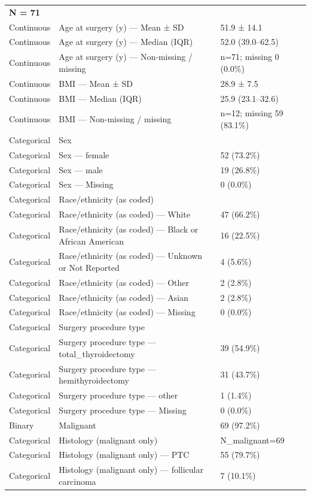\begin{table}[htbp]
\begin{tabular}{lll}
\multicolumn{3}{l}{\textbf{N = 71}} \\
Continuous & Age at surgery (y) — Mean ± SD & 51.9 ± 14.1 \\
Continuous & Age at surgery (y) — Median (IQR) & 52.0 (39.0–62.5) \\
Continuous & Age at surgery (y) — Non-missing / missing & n=71; missing 0 (0.0\%) \\
Continuous & BMI — Mean ± SD & 28.9 ± 7.5 \\
Continuous & BMI — Median (IQR) & 25.9 (23.1–32.6) \\
Continuous & BMI — Non-missing / missing & n=12; missing 59 (83.1\%) \\
Categorical & Sex &  \\
Categorical & Sex — female & 52 (73.2\%) \\
Categorical & Sex — male & 19 (26.8\%) \\
Categorical & Sex — Missing & 0 (0.0\%) \\
Categorical & Race/ethnicity (as coded) &  \\
Categorical & Race/ethnicity (as coded) — White & 47 (66.2\%) \\
Categorical & Race/ethnicity (as coded) — Black or African American & 16 (22.5\%) \\
Categorical & Race/ethnicity (as coded) — Unknown or Not Reported & 4 (5.6\%) \\
Categorical & Race/ethnicity (as coded) — Other & 2 (2.8\%) \\
Categorical & Race/ethnicity (as coded) — Asian & 2 (2.8\%) \\
Categorical & Race/ethnicity (as coded) — Missing & 0 (0.0\%) \\
Categorical & Surgery procedure type &  \\
Categorical & Surgery procedure type — total\_thyroidectomy & 39 (54.9\%) \\
Categorical & Surgery procedure type — hemithyroidectomy & 31 (43.7\%) \\
Categorical & Surgery procedure type — other & 1 (1.4\%) \\
Categorical & Surgery procedure type — Missing & 0 (0.0\%) \\
Binary & Malignant & 69 (97.2\%) \\
Categorical & Histology (malignant only) & N\_malignant=69 \\
Categorical & Histology (malignant only) — PTC & 55 (79.7\%) \\
Categorical & Histology (malignant only) — follicular carcinoma & 7 (10.1\%) \\

\end{tabular}
\end{table}
